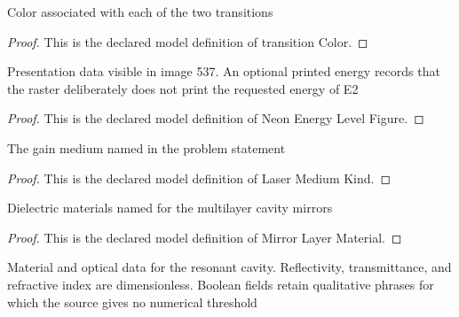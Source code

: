 \begin{definition}
  \label{def:physics:phyx-mini-0537:phyxminiproblems-problemphyxmini0537-transitioncolor}
  Color associated with each of the two transitions
\end{definition}
\begin{proof}
  This is the declared model definition of transition Color.
\end{proof}
\begin{definition}
  \label{def:physics:phyx-mini-0537:phyxminiproblems-problemphyxmini0537-neonenergylevelfigure}
  Presentation data visible in image 537. An optional printed energy records that the raster deliberately does not print the requested energy of E2
\end{definition}
\begin{proof}
  This is the declared model definition of Neon Energy Level Figure.
\end{proof}
\begin{definition}
  \label{def:physics:phyx-mini-0537:phyxminiproblems-problemphyxmini0537-lasermediumkind}
  The gain medium named in the problem statement
\end{definition}
\begin{proof}
  This is the declared model definition of Laser Medium Kind.
\end{proof}
\begin{definition}
  \label{def:physics:phyx-mini-0537:phyxminiproblems-problemphyxmini0537-mirrorlayermaterial}
  Dielectric materials named for the multilayer cavity mirrors
\end{definition}
\begin{proof}
  This is the declared model definition of Mirror Layer Material.
\end{proof}
\begin{definition}
  \label{def:physics:phyx-mini-0537:phyxminiproblems-problemphyxmini0537-resonantcavitydata}
  Material and optical data for the resonant cavity. Reflectivity, transmittance, and refractive index are dimensionless. Boolean fields retain qualitative phrases for which the source gives no numerical threshold
\end{definition}
